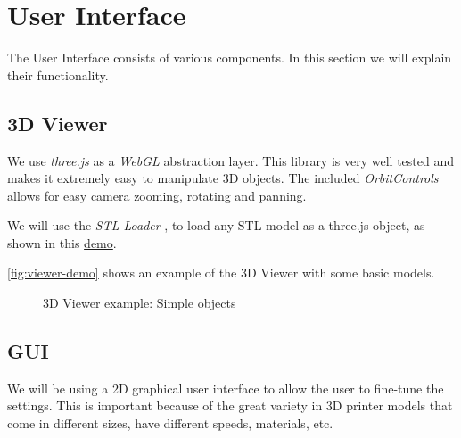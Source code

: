 \pagebreak

\section{User Interface}
The User Interface consists of various components. In this section we will explain their functionality.

\subsection{3D Viewer}
We use \emph{three.js} as a \emph{WebGL} \cite{webgl} abstraction layer. This library is very well tested and makes it extremely easy to manipulate 3D objects. The included  \emph{OrbitControls} \cite{three:orbit-controls} allows for easy camera zooming, rotating and panning.

We will use the \emph{STL Loader} \cite{three:stl-loader}, to load any STL model as a three.js object, as shown in this \href{https://threejs.org/examples/?q=stl#webgl_loader_stl}{demo}.


\autoref{fig:viewer-demo} shows an example of the 3D Viewer with some basic models.

\begin{figure}[H]
    \noindent{}
    \caption{3D Viewer example: Simple objects}
    \label{fig:viewer-demo}
\end{figure}


\subsection{GUI}
We will be using a 2D graphical user interface to allow the user to fine-tune the settings. This is important because of the great variety in 3D printer models that come in different sizes, have different speeds, materials, etc.

